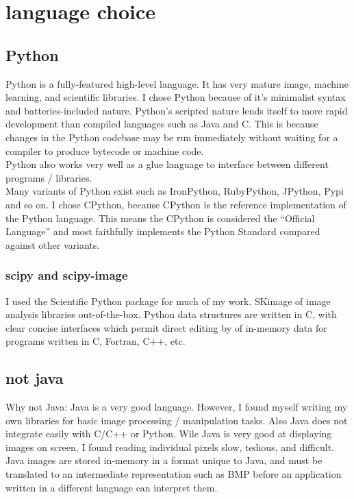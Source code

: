 \chapter{language choice}

\section{Python}
Python is a fully-featured high-level language. It has very mature image, machine learning, and scientific libraries.  I chose Python because of it's minimalist syntax and batteries-included nature.  Python's scripted nature lends itself to more rapid development than compiled languages such as Java and C. This is because changes in the Python codebase may be run immediately without waiting for a compiler to produce bytecode or machine code.\\
Python also works very well as a glue language to interface between different programs / libraries.\\
Many variants of Python exist such as IronPython, RubyPython, JPython, Pypi and so on. I chose CPython, because CPython is the reference implementation of the Python language.  This means the CPython is considered the ``Official Language'' and most faithfully implements the Python Standard compared against other variants.

\subsection{scipy and scipy-image}
I used the Scientific Python package for much of my work. SKimage of image analysis libraries out-of-the-box.  Python data structures are written in C, with clear concise interfaces which permit direct editing by of in-memory data for programs written in C, Fortran, C++, etc.

\section{not java}
Why not Java:  Java is a very good language. However, I found myself writing my own libraries for basic image processing / manipulation tasks.  Also Java does not integrate easily with C/C++ or Python.  Wile Java is very good at displaying images on screen, I found reading individual pixels slow, tedious, and difficult.  Java images are stored in-memory in a format unique to Java, and must be translated to an intermediate representation such as BMP before an application written in a different language can interpret them.

